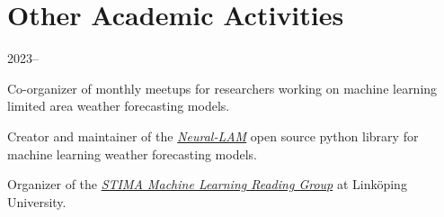 \section*{Other Academic Activities}
\begin{labeling}{2023--}
    \item [2023--] Co-organizer of monthly meetups for researchers working on machine learning limited area weather forecasting models. %
    \item [2023--] Creator and maintainer of the \href{https://github.com/mllam/neural-lam}{\textit{Neural-LAM}} open source python library for machine learning weather forecasting models.
    \item [2022--] Organizer of the \href{https://github.com/STIMALiU/ml-reading-group}{\textit{STIMA Machine Learning Reading Group}} at Linköping University.
\end{labeling}
